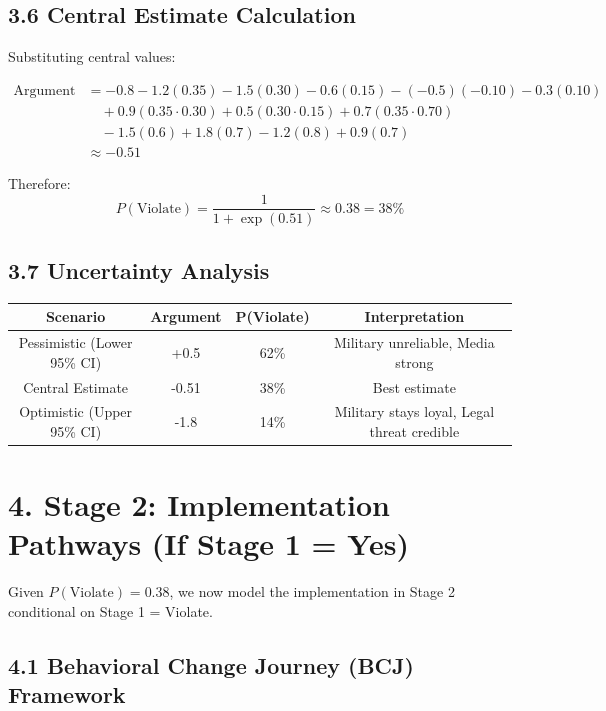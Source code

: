 \subsection{3.6 Central Estimate Calculation}

Substituting central values:

\begin{align}
\text{Argument} &= -0.8 - 1.2(0.35) - 1.5(0.30) - 0.6(0.15) - (-0.5)(-0.10) - 0.3(0.10) \\
&\quad + 0.9(0.35 \cdot 0.30) + 0.5(0.30 \cdot 0.15) + 0.7(0.35 \cdot 0.70) \\
&\quad - 1.5(0.6) + 1.8(0.7) - 1.2(0.8) + 0.9(0.7) \\
&\approx -0.51
\end{align}

Therefore:
\begin{equation}
P(\text{Violate}) = \frac{1}{1 + \exp(0.51)} \approx 0.38 = \boxed{38\%}
\end{equation}

\subsection{3.7 Uncertainty Analysis}

\begin{table}[h]
\centering
\begin{tabular}{|c|c|c|c|}
\hline
\textbf{Scenario} & \textbf{Argument} & \textbf{P(Violate)} & \textbf{Interpretation} \\
\hline
Pessimistic (Lower 95\% CI) & +0.5 & 62\% & Military unreliable, Media strong \\
Central Estimate & -0.51 & 38\% & Best estimate \\
Optimistic (Upper 95\% CI) & -1.8 & 14\% & Military stays loyal, Legal threat credible \\
\hline
\end{tabular}
\end{table}

\section{4. Stage 2: Implementation Pathways (If Stage 1 = Yes)}

Given $P(\text{Violate}) = 0.38$, we now model the implementation in Stage 2 conditional on Stage 1 = Violate.

\subsection{4.1 Behavioral Change Journey (BCJ) Framework}


